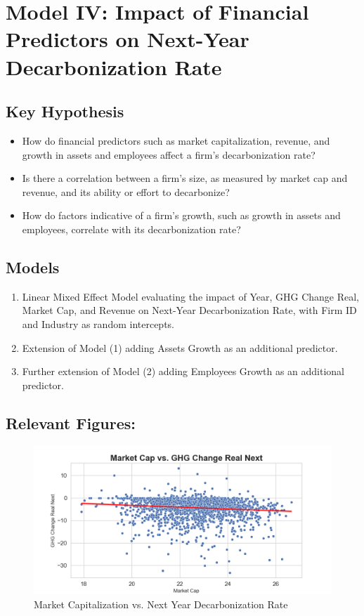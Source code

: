  

\section{Model IV: Impact of Financial Predictors on Next-Year Decarbonization Rate}

\subsection{Key Hypothesis}
\begin{itemize}
    \item How do financial predictors such as market capitalization, revenue, and growth in assets and employees affect a firm's decarbonization rate?
    \item Is there a correlation between a firm's size, as measured by market cap and revenue, and its ability or effort to decarbonize?
    \item How do factors indicative of a firm's growth, such as growth in assets and employees, correlate with its decarbonization rate?
\end{itemize}

\subsection{Models} 
\begin{enumerate}
    \item Linear Mixed Effect Model evaluating the impact of Year, GHG Change Real, Market Cap, and Revenue on Next-Year Decarbonization Rate, with Firm ID and Industry as random intercepts.
    \item Extension of Model (1) adding Assets Growth as an additional predictor.
    \item Further extension of Model (2) adding Employees Growth as an additional predictor.
\end{enumerate}



\subsection{Relevant Figures:}
\begin{figure}[H]
\centering
  \includegraphics[width=\textwidth]{figures/market_cap_vs_ghg_change_real_next.png}
\caption{Market Capitalization vs. Next Year Decarbonization Rate}
\label{fig:market_cap_vs_ghg_change_real_next}
\end{figure}

